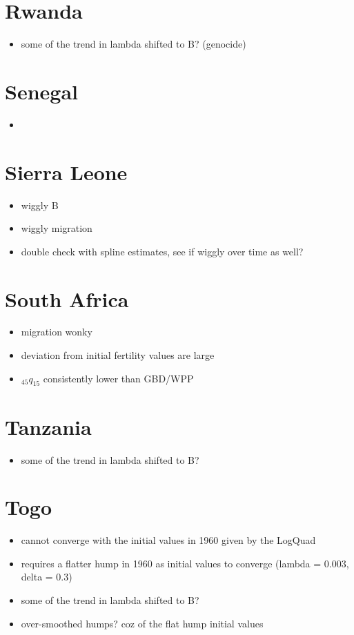 \documentclass[12pt,a4paper]{article}
\begin{document}
\section*{Rwanda}
\begin{itemize}
\item some of the trend in lambda shifted to B? (genocide)
\end{itemize}

\section*{Senegal}
\begin{itemize}
\item
\end{itemize}

\section*{Sierra Leone}
\begin{itemize}
\item wiggly B
\item wiggly migration
\item double check with spline estimates, see if wiggly over time as well?
\end{itemize}

\section*{South Africa}
\begin{itemize}
\item migration wonky
\item deviation from initial fertility values are large
\item $_{45}q_{15}$ consistently lower than GBD/WPP
\end{itemize}

\section*{Tanzania}
\begin{itemize}
\item some of the trend in lambda shifted to B?
\end{itemize}

\section*{Togo}
\begin{itemize}
\item cannot converge with the initial values in 1960 given by the LogQuad
\item requires a flatter hump in 1960 as initial values to converge (lambda = 0.003, delta = 0.3)
\item some of the trend in lambda shifted to B?
\item over-smoothed humps? coz of the flat hump initial values
\end{itemize}
\end{document}

